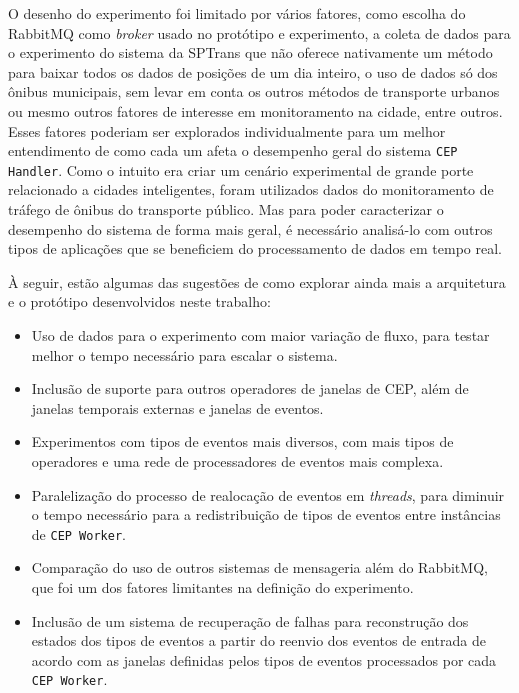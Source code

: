 O desenho do experimento foi limitado por vários fatores, como escolha do RabbitMQ como \textit{broker} usado no protótipo e experimento, a coleta de dados para o experimento do sistema da SPTrans que não oferece nativamente um método para baixar todos os dados de posições de um dia inteiro, o uso de dados só dos ônibus municipais, sem levar em conta os outros métodos de transporte urbanos ou mesmo outros fatores de interesse em monitoramento na cidade, entre outros. Esses fatores poderiam ser explorados individualmente para um melhor entendimento de como cada um afeta o desempenho geral do sistema  \texttt{CEP Handler}. %
Como o intuito era criar um cenário experimental de grande porte relacionado a cidades inteligentes, foram utilizados dados do monitoramento de tráfego de ônibus do transporte público. Mas para poder caracterizar o desempenho do sistema de forma mais geral, é necessário analisá-lo com outros tipos de aplicações que se beneficiem do processamento de dados em tempo real. 

À seguir, estão algumas das sugestões de como explorar ainda mais a arquitetura e o protótipo desenvolvidos neste trabalho:

\begin{itemize}
    \item Uso de dados para o experimento com maior variação de fluxo, para testar melhor o tempo necessário para escalar o sistema.
    \item Inclusão de suporte para outros operadores de janelas de CEP, além de janelas temporais externas e janelas de eventos.
    \item Experimentos com tipos de eventos mais diversos, com mais tipos de operadores e uma rede de processadores de eventos mais complexa.
    \item Paralelização do processo de realocação de eventos em \textit{threads}, para diminuir o tempo necessário para a redistribuição de tipos de eventos entre instâncias de \texttt{CEP Worker}.
    \item Comparação do uso de outros sistemas de mensageria além do RabbitMQ, que foi um dos fatores limitantes na definição do experimento.
    \item Inclusão de um sistema de recuperação de falhas para reconstrução dos estados dos tipos de eventos a partir do reenvio dos eventos de entrada de acordo com as janelas definidas pelos tipos de eventos processados por cada \texttt{CEP Worker}.
\end{itemize}

